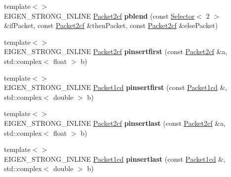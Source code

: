 \begin{DoxyCompactItemize}
{\footnotesize template$<$$>$ }\\E\+I\+G\+E\+N\+\_\+\+S\+T\+R\+O\+N\+G\+\_\+\+I\+N\+L\+I\+NE \hyperlink{struct_eigen_1_1internal_1_1_packet2cf}{Packet2cf} {\bfseries pblend} (const \hyperlink{struct_eigen_1_1internal_1_1_selector}{Selector}$<$ 2 $>$ \&if\+Packet, const \hyperlink{struct_eigen_1_1internal_1_1_packet2cf}{Packet2cf} \&then\+Packet, const \hyperlink{struct_eigen_1_1internal_1_1_packet2cf}{Packet2cf} \&else\+Packet)
\item 
\mbox{\label{namespace_eigen_1_1internal_a49e8eec683eaff076dbdab4102a2ce38}} 
{\footnotesize template$<$$>$ }\\E\+I\+G\+E\+N\+\_\+\+S\+T\+R\+O\+N\+G\+\_\+\+I\+N\+L\+I\+NE \hyperlink{struct_eigen_1_1internal_1_1_packet2cf}{Packet2cf} {\bfseries pinsertfirst} (const \hyperlink{struct_eigen_1_1internal_1_1_packet2cf}{Packet2cf} \&a, std\+::complex$<$ float $>$ b)
\item 
\mbox{\label{namespace_eigen_1_1internal_aa3e93280e4bdb137637c11a525ba4d5e}} 
{\footnotesize template$<$$>$ }\\E\+I\+G\+E\+N\+\_\+\+S\+T\+R\+O\+N\+G\+\_\+\+I\+N\+L\+I\+NE \hyperlink{struct_eigen_1_1internal_1_1_packet1cd}{Packet1cd} {\bfseries pinsertfirst} (const \hyperlink{struct_eigen_1_1internal_1_1_packet1cd}{Packet1cd} \&, std\+::complex$<$ double $>$ b)
\item 
\mbox{\label{namespace_eigen_1_1internal_a89c564ca8cb05083894165b15c4fd998}} 
{\footnotesize template$<$$>$ }\\E\+I\+G\+E\+N\+\_\+\+S\+T\+R\+O\+N\+G\+\_\+\+I\+N\+L\+I\+NE \hyperlink{struct_eigen_1_1internal_1_1_packet2cf}{Packet2cf} {\bfseries pinsertlast} (const \hyperlink{struct_eigen_1_1internal_1_1_packet2cf}{Packet2cf} \&a, std\+::complex$<$ float $>$ b)
\item 
\mbox{\label{namespace_eigen_1_1internal_ae89f970de870fe2d824ad06363cb8438}} 
{\footnotesize template$<$$>$ }\\E\+I\+G\+E\+N\+\_\+\+S\+T\+R\+O\+N\+G\+\_\+\+I\+N\+L\+I\+NE \hyperlink{struct_eigen_1_1internal_1_1_packet1cd}{Packet1cd} {\bfseries pinsertlast} (const \hyperlink{struct_eigen_1_1internal_1_1_packet1cd}{Packet1cd} \&, std\+::complex$<$ double $>$ b)
\item 

\end{DoxyCompactItemize}

